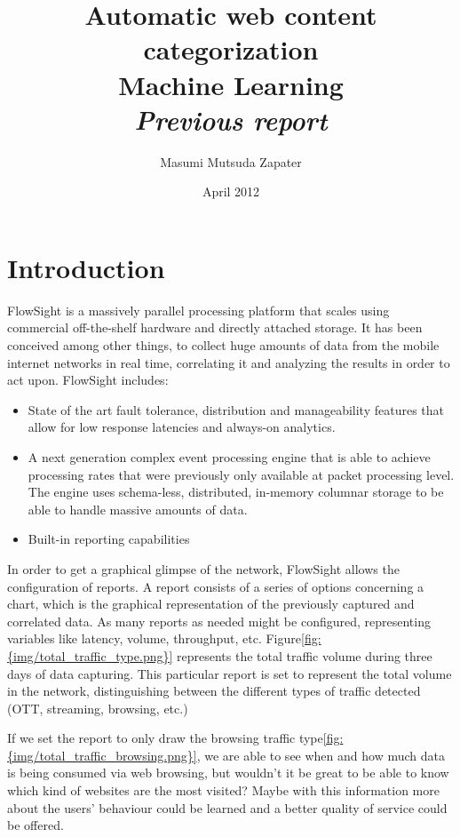 \documentclass[12pt, a4paper , titlepage]{report}
\author{Masumi Mutsuda Zapater}
\title{Automatic web content categorization \\ Machine Learning \\ \large{\textit{Previous report}}}
\date{April 2012}
\begin{document}
\maketitle

\tableofcontents

\chapter{Introduction}
FlowSight is a massively parallel processing platform that scales using commercial off-the-shelf hardware and directly attached storage. It has been conceived among other things, to collect
huge amounts of data from the mobile internet networks in real time, correlating it and analyzing the results in order to act upon. FlowSight includes:
\begin{itemize}
  \item{State of the art fault tolerance, distribution and manageability features that allow for low response latencies and always-on analytics.}
  \item{A next generation complex event processing engine that is able to achieve processing rates that were previously only available at packet processing level. The engine uses schema-less, 
        distributed, in-memory columnar storage to be able to handle massive amounts of data.}
  \item{Built-in reporting capabilities}
\end{itemize}
In order to get a graphical glimpse of the network, FlowSight allows the configuration of reports. A report consists of a series of options concerning a chart, which is the graphical representation
of the previously captured and correlated data. As many reports as needed might be configured, representing variables like latency, volume, throughput, etc.   
Figure\ref{fig:{img/total_traffic_type.png}} represents the total traffic volume during three days of data capturing. This particular report is set to represent the total volume in the network, 
distinguishing between the different types of traffic detected (OTT, streaming, browsing, etc.)

If we set the report to only draw the browsing traffic type\ref{fig:{img/total_traffic_browsing.png}}, we are able to see when and how much data is being consumed via web browsing, but wouldn't it be 
great to be able to know which kind of websites are the most visited? Maybe with this information more about the users' behaviour could be learned and a better quality of service could be offered.
\end{document}
